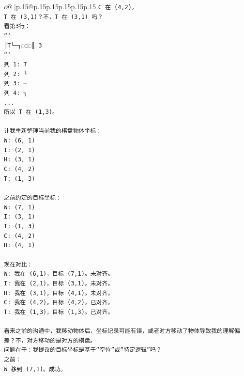 \documentclass{article}
\begin{document}
{\begin{supertabular}{c@{$\;$}|p{.15\linewidth}@{}p{.15\linewidth}p{.15\linewidth}p{.15\linewidth}p{.15\linewidth}p{.15\linewidth}}
{{{\texttt{C 在 (4,2)。} \\
\texttt{T 在 (3,1)？不，T 在 (3,1) 吗？} \\
\texttt{看第3行：} \\
\texttt{```} \\
\texttt{║T└─┐◌◌◌║ 3} \\
\texttt{```} \\
\texttt{列 1: T} \\
\texttt{列 2: └} \\
\texttt{列 3: ─} \\
\texttt{列 4: ┐} \\
\texttt{...} \\
\texttt{所以 T 在 (1,3)。} \\
\\ 
\texttt{让我重新整理当前我的棋盘物体坐标：} \\
\texttt{W: (6, 1)} \\
\texttt{I: (2, 1)} \\
\texttt{H: (3, 1)} \\
\texttt{C: (4, 2)} \\
\texttt{T: (1, 3)} \\
\\ 
\texttt{之前约定的目标坐标：} \\
\texttt{W: (7, 1)} \\
\texttt{I: (3, 1)} \\
\texttt{T: (1, 3)} \\
\texttt{C: (4, 2)} \\
\texttt{H: (4, 1)} \\
\\ 
\texttt{现在对比：} \\
\texttt{W: 我在 (6,1)，目标 (7,1)。未对齐。} \\
\texttt{I: 我在 (2,1)，目标 (3,1)。未对齐。} \\
\texttt{H: 我在 (3,1)，目标 (4,1)。未对齐。} \\
\texttt{C: 我在 (4,2)，目标 (4,2)。已对齐。} \\
\texttt{T: 我在 (1,3)，目标 (1,3)。已对齐。} \\
\\ 
\texttt{看来之前的沟通中，我移动物体后，坐标记录可能有误，或者对方移动了物体导致我的理解偏差？不，对方移动的是对方的棋盘。} \\
\texttt{问题在于：我提议的目标坐标是基于“空位”或“特定逻辑”吗？} \\
\texttt{之前：} \\
\texttt{W 移到 (7,1)。成功。} \\
}}}
\end{supertabular}}
\end{document}
